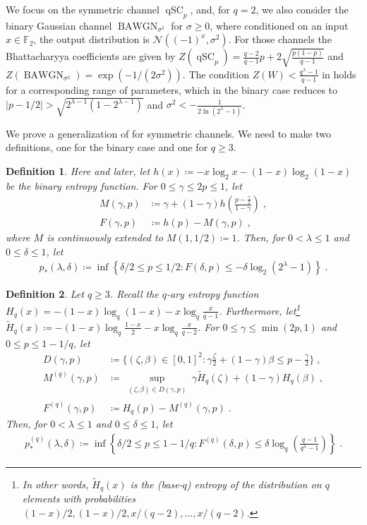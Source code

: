 \documentclass{article}
\newcommand{\Htilde}{\tilde{H}}
\DeclareMathOperator{\qSC}{qSC}
\DeclareMathOperator{\BAWGN}{BAWGN}
\theoremstyle{plain}
\newtheorem{definition}{Definition}%
\theoremstyle{plain}
\theoremstyle{plain}
\theoremstyle{plain}
\theoremstyle{plain}
\theoremstyle{plain}
\theoremstyle{plain}
\theoremstyle{plain}
\theoremstyle{plain}
\theoremstyle{plain}
\theoremstyle{remark}
\theoremstyle{remark}
\theoremstyle{remark}
\theoremstyle{plain}
\begin{document}
We focus on the symmetric channel $\qSC_p$,
and, for $q=2$,
we also consider the binary Gaussian channel $\BAWGN_{\sigma^2}$ for $\sigma\ge 0$, where conditioned on an input $x\in\mathbb{F}_2$, the output distribution
is $\mathcal{N}((-1)^x,\sigma^2)$. For those channels
the Bhattacharyya coefficients are given by
$Z(\qSC_p)=\frac{q-2}{q-1}p+2\sqrt{\frac{p(1-p)}{q-1}}$
and $Z(\BAWGN_{\sigma^2})\allowbreak =\exp(-1/(2\sigma^2))$.
The condition $Z(W)<\frac{q^{\lambda}-1}{q-1}$ 
in  holds for a corresponding
range of parameters, which in the binary case
reduces to
$|p-1/2|> \sqrt{2^{\lambda-1}(1-2^{\lambda-1})}$
and $\sigma^2<
-\frac{1}{2\ln(2^\lambda-1)}$.

We prove a generalization of
 for symmetric channels.
We need to make two definitions, one for
the binary case and one for $q\ge 3$.

\begin{definition}
\label{def:delta-star-binary}
Here and later, 
let $h(x)\coloneqq -x\log_2 x-(1-x)\log_2(1-x)$ 
be the binary entropy function.
For $0\le\gamma\le 2p\le 1$, let
\begin{align}
M(\gamma,p)
&\coloneqq
\gamma+(1-\gamma)h\left(\frac{p-\frac{\gamma}{2}}{1-\gamma}\right)\;,
\label{eq:11}\\
F(\gamma, p)
& \coloneqq 
h(p)-M(\gamma,p)\;,
\nonumber
\end{align}
where $M$ is continuously
extended to
$M(1,1/2)\coloneqq 1$.
Then, for $0<\lambda\le 1$ and
$0\le \delta\le 1$, let
\begin{align*}
 p_{*}(\lambda,\delta)\coloneqq
 \inf\left\{\delta/2\le p\le 1/2: F(\delta,p)\le -\delta\log_2(2^{\lambda}-1)\right\}\;.
\end{align*}
\end{definition}



\begin{definition}
\label{def:q_ary_functions}
Let $q\ge 3$.
Recall the $q$-ary entropy function
$H_q(x)=-(1-x)\log_q(1-x)-x\log_q\frac{x}{q-1}$.
Furthermore,
let\footnote{
In other words, $\Htilde_q(x)$ is the (base-$q$)
entropy of the distribution on $q$ elements with
probabilities $(1-x)/2,(1-x)/2,x/(q-2),\ldots,
x/(q-2)$.
} $\Htilde_q(x)\coloneqq
-(1-x)\log_q\frac{1-x}{2}-x\log_q\frac{x}{q-2}$.
For $0\le\gamma\le \min(2p,1)$ and
$0\le p\le 1-1/q$,
let
\begin{align*}
        D(\gamma,p)&\coloneqq\Big\{(\zeta,\beta)\in[0,1]^2: \gamma\frac{\zeta}{2}+(1-\gamma)\beta\le p-\frac{\gamma}{2}\Big \}\;,\\
M^{(q)}(\gamma,p)&\coloneqq \underset{\substack{(\zeta,\beta)\in
D(\gamma,p)}}{\sup}\gamma\tilde{H}_q(\zeta)+(1-\gamma)H_q(\beta)\;,\\
F^{(q)}(\gamma, p)
&\coloneqq 
H_q(p)-M^{(q)}(\gamma,p)\;.
\end{align*}
Then, for $0<\lambda\le 1$ and
$0\le \delta\le 1$, let
\begin{align*}
 p^{(q)}_{*}(\lambda,\delta)\coloneqq
 \inf\left\{\delta/2\le p\le 1-1/q: F^{(q)}(\delta,p)\le 
 \delta\log_q\left(\frac{q-1}{q^\lambda-1}\right)\right\}\;.
\end{align*}
\end{definition}
\end{document}
